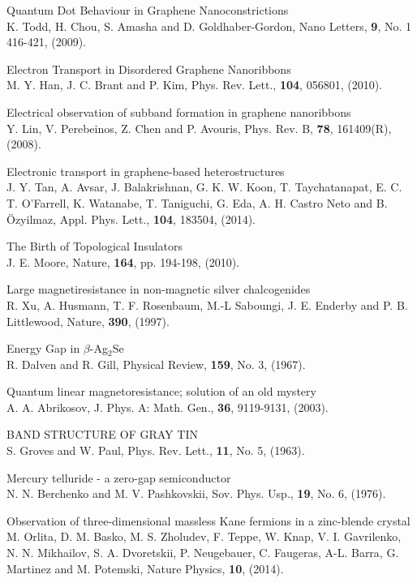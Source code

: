 \documentclass[12pt,a4paper]{report}
\begin{document}
\begin{thebibliography}{10}
 Quantum Dot Behaviour in Graphene Nanoconstrictions\\
K. Todd, H. Chou, S. Amasha and D. Goldhaber-Gordon,
Nano Letters, {\bf 9}, No. 1 416-421, (2009).

 Electron Transport in Disordered Graphene Nanoribbons\\
M. Y. Han, J. C. Brant and P. Kim,
Phys. Rev. Lett., {\bf 104}, 056801, (2010).

 Electrical observation of subband formation in graphene nanoribbons\\
Y. Lin, V. Perebeinos, Z. Chen and P. Avouris,
Phys. Rev. B, {\bf 78}, 161409(R), (2008).

Electronic transport in graphene-based heterostructures\\
J. Y. Tan, A. Avsar, J. Balakrishnan, G. K. W. Koon, T. Taychatanapat, E. C. T. O'Farrell, K. Watanabe, T. Taniguchi, G. Eda, A. H. Castro Neto and B. Özyilmaz,
Appl. Phys. Lett., {\bf 104}, 183504, (2014).

The Birth of Topological Insulators\\
J. E. Moore, 
Nature, {\bf164}, pp. 194-198, (2010).

 Large magnetiresistance in non-magnetic silver chalcogenides\\
R. Xu, A. Husmann, T. F. Rosenbaum, M.-L Saboungi, J. E. Enderby and P. B. Littlewood,
Nature, {\bf 390}, (1997).

 Energy Gap in $\beta$-Ag$_{2}$Se\\
R. Dalven and R. Gill,
Physical Review, {\bf 159}, No. 3, (1967).

 Quantum linear magnetoresistance; solution of an old mystery\\
A. A. Abrikosov,
J. Phys. A: Math. Gen., {\bf 36}, 9119-9131, (2003).

 BAND STRUCTURE OF GRAY TIN\\
S. Groves and W. Paul,
Phys. Rev. Lett., {\bf 11}, No. 5, (1963).

 Mercury telluride - a zero-gap semiconductor\\
N. N. Berchenko and M. V. Pashkovskii,
Sov. Phys. Usp., {\bf 19}, No. 6, (1976).

 Observation of three-dimensional massless Kane fermions in a zinc-blende crystal\\
M. Orlita, D. M. Basko, M. S. Zholudev, F. Teppe, W. Knap, V. I. Gavrilenko, N. N. Mikhailov, S. A. Dvoretskii, P. Neugebauer, C. Faugeras, A-L. Barra, G. Martinez and M. Potemski,
Nature Physics, {\bf 10}, (2014).


\end{thebibliography}
\end{document}
